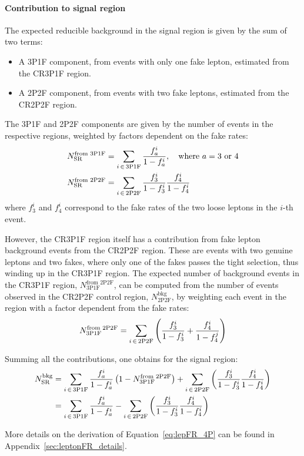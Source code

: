 \paragraph{Contribution to signal region\\}
The expected reducible background in the signal region is given by the sum of two terms:
\begin{itemize}
  \item A 3P1F component, from events with only one fake lepton, estimated from the CR3P1F region.
  \item A 2P2F component, from events with two fake leptons, estimated from the CR2P2F region.
\end{itemize}

The 3P1F and 2P2F components are given by the number of events in the respective regions, weighted by factors dependent on the fake rates:
\begin{subequations}
  \begin{align}
    \label{eq:lepFR_3P1Fto4P}
    N^{\text{from 3P1F}}_{\text{SR}} &= \sum_{i \,\in\, \text{3P1F}} \frac{f_a^i}{1-f_a^i}, \quad \text{where } a = 3 \text{ or } 4
    \\
    \label{eq:lepFR_2P2Fto4P}
    N^{\text{from 2P2F}}_{\text{SR}} &= \sum_{i \,\in\, \text{2P2F}} \frac{f_3^i}{1-f_3^i} \frac{f_4^i}{1-f_4^i}
  \end{align}
\end{subequations}
where $f_3^i$ and $f_4^i$ correspond to the fake rates of the two loose leptons in the $i$-th event.

However, the CR3P1F region itself has a contribution from fake lepton background events from the CR2P2F region.
These are events with two genuine leptons and two fakes, where only one of the fakes passes the tight selection, thus winding up in the CR3P1F region.
The expected number of background events in the CR3P1F region, $N^{\text{from 2P2F}}_{\text{3P1F}}$,
can be computed from the number of events observed in the CR2P2F control region, $N^{\text{bkg}}_{\text{2P2F}}$,
by weighting each event in the region with a factor dependent from the fake rates:
\begin{equation}
  \label{eq:lepFR_N3P1F}
  N^{\text{from 2P2F}}_{\text{3P1F}} = \sum_{i \,\in\, \text{2P2F}} \left( \frac{f_3^i}{1-f_3^i} + \frac{f_4^i}{1-f_4^j} \right)
\end{equation}

Summing all the contributions, one obtains for the signal region:
\begin{equation}
  \begin{split}
    \label{eq:lepFR_4P}
    N^{\text{bkg}}_{\text{SR}} &= \sum_{i \,\in\, \text{3P1F}} \frac{f_a^i}{1-f_a^i} \left( 1 - N^{\text{from 2P2F}}_{\text{3P1F}} \right)
                               + \sum_{i \,\in\, \text{2P2F}} \left( \frac{f_3^i}{1-f_3^i} \frac{f_4^i}{1-f_4^i} \right)
    \\
                 &= \sum_{i \,\in\, \text{3P1F}} \frac{f_a^i}{1-f_a^i} - \sum_{i \,\in\, \text{2P2F}} \left( \frac{f_3^i}{1-f_3^i} \frac{f_4^i}{1-f_4^i} \right)
  \end{split}
\end{equation}

More details on the derivation of Equation~\ref{eq:lepFR_4P} can be found in Appendix~\ref{sec:leptonFR_details}.
